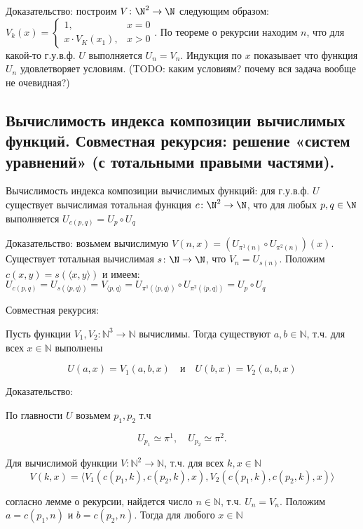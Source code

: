 \documentclass[a4paper, 10pt]{article}
\begin{document}
Доказательство: построим $V\colon\N^2\to\N$ следующим образом: $V_k(x)=\begin{cases}
    1,&x=0 \\ x\cdot V_K(x_1),&x>0
\end{cases}$. По теореме о рекурсии находим $n$, что для какой-то г.у.в.ф. $U$ выполняется $U_n=V_n$. Индукция по $x$ показывает что функция $U_n$ удовлетворяет условиям. (TODO: каким условиям? почему вся задача вообще не очевидная?)

\subsection{Вычислимость индекса композиции вычислимых функций. Совместная рекурсия: решение «систем уравнений» (с тотальными правыми частями).}

Вычислимость индекса композиции вычислимых функций: для г.у.в.ф. $U$ существует вычислимая тотальная функция $c\colon\N^2\to\N$, что для любых $p,q\in\N$ выполняется $U_{c(p,q)}=U_p \circ U_q$

Доказательство: возьмем вычислимую $V(n,x)=(U_{\pi^1(n)}\circ U_{\pi^2(n)})(x)$. Существует тотальная вычислимая $s\colon\N\to\N$, что $V_n=U_{s(n)}$. Положим $c(x,y)=s(\langle x,y \rangle)$ и имеем: $U_{c(p,q)}=U_{s(\langle p,q\rangle)}=V_{\langle p,q \rangle}=U_{\pi^1(\langle p,q \rangle)}\circ U_{\pi^2(\langle p,q \rangle)}=U_p \circ U_q$

\hfill

Совместная рекурсия: 

Пусть функции $V_1, V_2: \mathbb{N}^3 \to \mathbb{N}$ вычислимы. Тогда существуют $a, b \in \mathbb{N}$, т.ч. для всех $x \in \mathbb{N}$ выполнены

$$ U(a, x)=V_1(a, b, x) \quad \text{и} \quad U(b, x)=V_2(a, b, x) $$

Доказательство: 

По главности $U$ возьмем $p_1, p_2$ т.ч

$$ U_{p_1} \simeq \pi^1, \quad U_{p_2} \simeq \pi^2. $$

Для вычислимой функции $V: \mathbb{N}^2 \to \mathbb{N}$, т.ч. для всех $k, x \in \mathbb{N}$
$$ V(k, x)= \langle V_1(c(p_1, k), c(p_2, k), x), V_2(c(p_1, k), c(p_2, k), x)\rangle $$

согласно лемме о рекурсии, найдется число $n \in \mathbb{N}$, т.ч. $U_n=V_n$. Положим $a=c(p_1, n)$ и $b=c(p_2, n)$. Тогда для любого $x \in \mathbb{N}$
\end{document}
